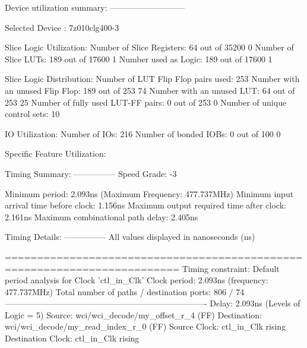 \documentclass{article}
\begin{document}
Device utilization summary:
---------------------------

Selected Device : 7z010clg400-3 


Slice Logic Utilization: 
 Number of Slice Registers:              64  out of  35200     0%
 Number of Slice LUTs:                  189  out of  17600     1%
    Number used as Logic:               189  out of  17600     1%

Slice Logic Distribution: 
 Number of LUT Flip Flop pairs used:    253
   Number with an unused Flip Flop:     189  out of    253    74%
   Number with an unused LUT:            64  out of    253    25%
   Number of fully used LUT-FF pairs:     0  out of    253     0%
   Number of unique control sets:        10

IO Utilization: 
 Number of IOs:                         216
 Number of bonded IOBs:                   0  out of    100     0%

Specific Feature Utilization:

\fi
\iffalse
Timing Summary:
---------------
Speed Grade: -3

   Minimum period: 2.093ns (Maximum Frequency: 477.737MHz)
   Minimum input arrival time before clock: 1.156ns
   Maximum output required time after clock: 2.161ns
   Maximum combinational path delay: 2.405ns

Timing Details:
---------------
All values displayed in nanoseconds (ns)

=========================================================================
Timing constraint: Default period analysis for Clock 'ctl_in_Clk'
  Clock period: 2.093ns (frequency: 477.737MHz)
  Total number of paths / destination ports: 806 / 74
-------------------------------------------------------------------------
Delay:               2.093ns (Levels of Logic = 5)
  Source:            wci/wci_decode/my_offset_r_4 (FF)
  Destination:       wci/wci_decode/my_read_index_r_0 (FF)
  Source Clock:      ctl_in_Clk rising
  Destination Clock: ctl_in_Clk rising
\end{document}

